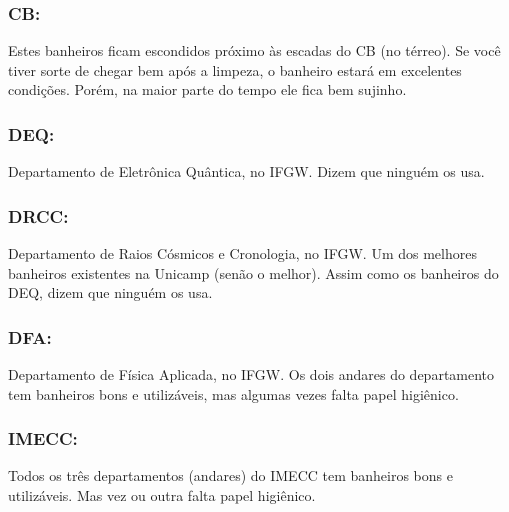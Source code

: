 \subsubsection{CB:} Estes banheiros ficam escondidos próximo às escadas do CB
(no térreo). Se você tiver sorte de chegar bem após a limpeza, o banheiro estará
em excelentes condições. Porém, na maior parte do tempo ele fica bem sujinho.

\subsubsection{DEQ:} Departamento de Eletrônica Quântica, no IFGW. Dizem que
ninguém os usa.

\subsubsection{DRCC:} Departamento de Raios Cósmicos e Cronologia, no IFGW.  Um
dos melhores banheiros existentes na Unicamp (senão o melhor). Assim como os
banheiros do DEQ, dizem que ninguém os usa.

\subsubsection{DFA:} Departamento de Física Aplicada, no IFGW. Os dois andares
do departamento tem banheiros bons e utilizáveis, mas algumas vezes falta papel
higiênico.

\subsubsection{IMECC:} Todos os três departamentos (andares) do IMECC tem
banheiros bons e utilizáveis. Mas vez ou outra falta papel higiênico.
